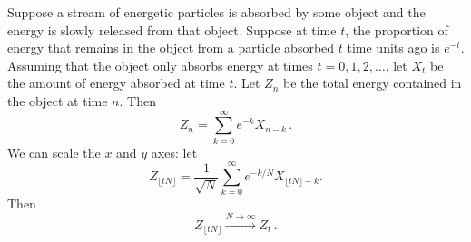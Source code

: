 \documentclass[../../../Master/AppliedStochastics.tex]{subfiles}
\begin{document}
\begin{example}
Suppose a stream of energetic particles is absorbed by some object
    and the energy is slowly released from that object.
Suppose at time $t$,
    the proportion of energy that remains in the object
    from a particle absorbed $t$ time units ago is $e^{-t}$.
Assuming that the object only absorbs energy at times $t = 0, 1, 2, \ldots$,
    let $X_t$ be the amount of energy absorbed at time $t$.
Let $Z_n$ be the total energy contained in the object at time $n$.
Then
\begin{equation*}
    Z_n = \sum_{k = 0}^\infty e^{-k}X_{n - k}\,.
\end{equation*}
We can scale the $x$ and $y$ axes: let
\begin{equation*}
    Z_{\lfloor t N\rfloor} = \frac{1}{\sqrt{N}} \sum_{k=0}^\infty
         e^{-k/N}X_{\lfloor t N\rfloor - k}.
\end{equation*}
Then
\begin{equation*}
    Z_{\lfloor t N\rfloor}\xrightarrow{N \to \infty} Z_t\,.
\end{equation*}
\end{example}


%
\end{document}
